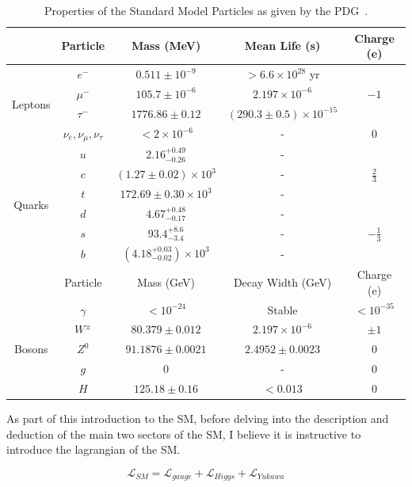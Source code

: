 \begin{table}[h]
    \centering
    \begin{tabular}{ccccc}
    \toprule
    & Particle & Mass (MeV) & Mean Life (s) & Charge (e) \\
    \midrule
    \multirow{4}{*}{Leptons} & $e^-$ & $0.511 \pm 10^{-9}$ & $> 6.6 \times 10^{28}$ yr &  \\
    & $\mu^-$ & $105.7 \pm 10^{-6}$ & $2.197 \times 10^{-6}$ & $-1$  \\
    & $\tau^-$ & $1776.86 \pm 0.12$ & $(290.3 \pm 0.5) \times 10^{-15}$ &  \\
    & $\nu_e, \nu_{\mu}, \nu_{\tau}$ & $< 2 \times 10^{-6}$ & - & $0$  \\
    \midrule
    \multirow{6}{*}{Quarks} & $u$ & $2.16^{+0.49}_{-0.26}$ & - &   \\
    & $c$ & $(1.27 \pm 0.02) \times 10^3$ & - & $\frac{2}{3}$  \\
    & $t$ & $172.69 \pm 0.30 \times 10^3$ & - &   \\
    & $d$ & $4.67^{+0.48}_{-0.17}$ & - &    \\
    & $s$ & $93.4^{+8.6}_{-3.4}$ & - & $-\frac{1}{3}$  \\
    & $b$ & $(4.18^{+0.03}_{-0.02}) \times 10^3$ & - &   \\
    \midrule
    & Particle & Mass (GeV) & Decay Width (GeV) & Charge (e) \\
    \midrule
    \multirow{5}{*}{Bosons} & $\gamma$ & $< 10^{-24}$ & Stable & $< 10^{-35}$  \\
    & $W^{\pm}$ & $80.379 \pm 0.012$ & $2.197 \times 10^{-6}$ & $\pm 1$  \\
    & $Z^0$ & $91.1876 \pm 0.0021$ & $2.4952 \pm 0.0023$ & $0$  \\
    & $g$ & $0$ & - & $0$  \\
    & $H$ & $125.18 \pm 0.16$ & $< 0.013$ & $0$  \\
    \bottomrule
    \end{tabular}
    \caption{Properties of the Standard Model Particles as given by the PDG~\cite{pdg}.}
    \label{table:pdg-table}
\end{table}


As part of this introduction to the SM, before delving into the description and deduction of the main 
two sectors of the SM, I believe it is instructive to introduce the lagrangian of the SM.

\begin{equation}
    \mathcal{L}_{SM} = \mathcal{L}_{gauge} + \mathcal{L}_{Higgs} + \mathcal{L}_{Yukawa}
\end{equation}


